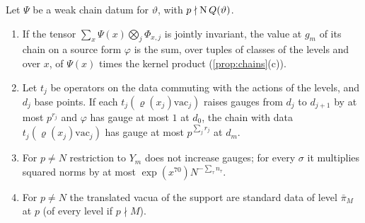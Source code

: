 \begin{proposition}\label{prop:chain-gauge}
Let $\Psi$ be a weak chain datum for $\vartheta$, with $p\nmid\operatorname{N} Q(\vartheta)$.
\begin{enumerate}[label=\textup{(\alph*)}]
\item If the tensor $\sum_x\Psi(x)\bigotimes_j\Phi_{x,j}$ is jointly invariant, the value at $g_m$ of its chain on a source form $\varphi$ is the sum,
over tuples of classes of the levels and over $x$, of $\Psi(x)$ times the kernel product (\cref{prop:chains}(c)).
\item Let $t_j$ be operators on the data commuting with the actions of the levels, and $d_j$ base points. If each
$t_j(\varrho(x_j)\mathrm{vac}_j)$ raises gauges from $d_j$ to $d_{j+1}$ by at most $p^{r_j}$ and $\varphi$ has gauge at most $1$ at $d_0$, the chain with
data $t_j(\varrho(x_j)\mathrm{vac}_j)$ has gauge at most $p^{\sum_jr_j}$ at $d_m$.
\item For $p\ne N$ restriction to $Y_m$ does not increase gauges; for every $\sigma$ it multiplies squared norms by at most
$\exp(x^{70})N^{-\sum_\tau n_\tau}$.
\item For $p\ne N$ the translated vacua of the support are standard data of level $\bar\pi_M$ at $p$ (of every level if $p\nmid M$).
\end{enumerate}
\end{proposition}

